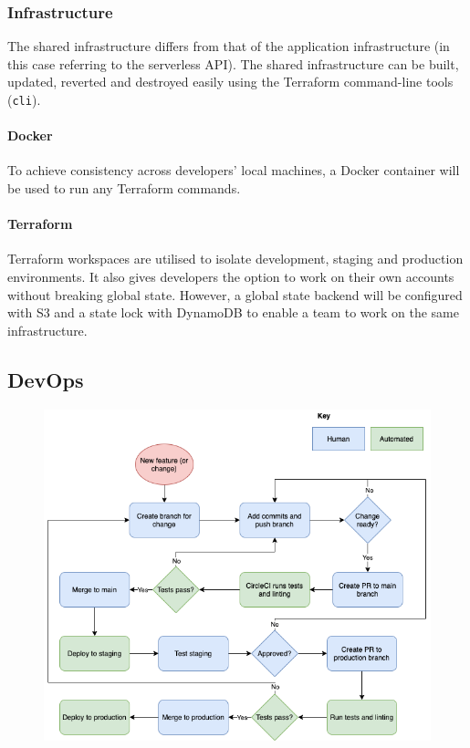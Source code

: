 \documentclass[10pt]{article}
\begin{document}
\subsubsection{Infrastructure}
The shared infrastructure differs from that of the application infrastructure (in this case referring to the serverless API). The shared infrastructure can be built, updated, reverted and destroyed easily using the Terraform command-line tools (\texttt{cli}). 

\paragraph{Docker}
To achieve consistency across developers' local machines, a Docker container will be used to run any Terraform commands.

\paragraph{Terraform}
Terraform workspaces are utilised to isolate development, staging and production environments. It also gives developers the option to work on their own accounts without breaking global state. However, a global state backend will be configured with S3 and a state lock with DynamoDB to enable a team to work on the same infrastructure.

\subsection{DevOps}
\begin{figure}[h!]
	\centering
	\includegraphics[width=0.9\linewidth]{images/DevOpsWorkflow.png}	
\end{figure}
\end{document}
